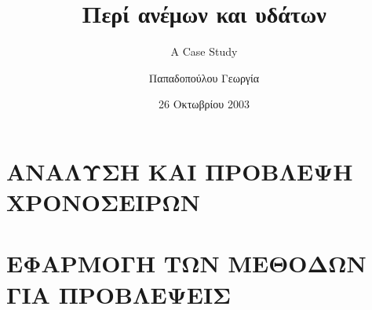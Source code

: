 \documentclass[twoside,a4paper]{book}
\author{Παπαδοπούλου Γεωργία}
\title{Περί ανέμων και υδάτων}
\subtitle{A Case Study}
\date{26 Οκτωβρίου 2003}
\begin{document}



\tableofcontents



\cleardoublepage


\part{ΑΝΑΛΥΣΗ ΚΑΙ ΠΡΟΒΛΕΨΗ ΧΡΟΝΟΣΕΙΡΩΝ}





\part{ΕΦΑΡΜΟΓΗ ΤΩΝ ΜΕΘΟΔΩΝ ΓΙΑ ΠΡΟΒΛΕΨΕΙΣ}



%

\appendix




\backmatter

\printindex

\clearpage


\end{document}
